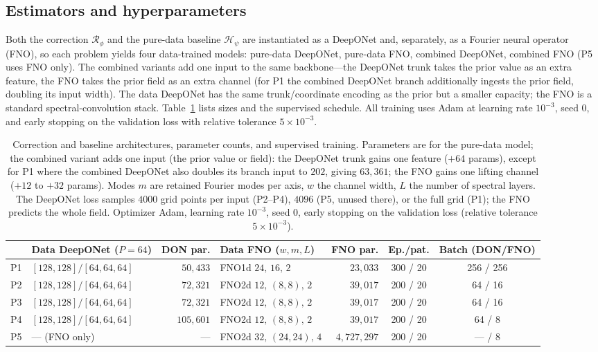 \documentclass[11pt]{article}
\newcommand{\Rcorr}{\mathcal{R}}
\begin{document}
\subsection{Estimators and hyperparameters}
\label{sec:corr-hparams}
Both the correction $\Rcorr_\phi$ and the pure-data baseline $\mathcal{H}_\psi$ are instantiated
as a DeepONet and, separately, as a Fourier neural operator (FNO), so each problem yields four
data-trained models: pure-data DeepONet, pure-data FNO, combined DeepONet, combined FNO
(P5 uses FNO only). The combined variants add one input to the same backbone---the DeepONet
trunk takes the prior value as an extra feature, the FNO takes the prior field as an extra
channel (for P1 the combined DeepONet branch additionally ingests the prior field, doubling its
input width). The data DeepONet has the same trunk/coordinate encoding as the prior but a smaller
capacity; the FNO is a standard spectral-convolution stack. Table~\ref{tab:corr} lists sizes and
the supervised schedule. All training uses Adam at learning rate $10^{-3}$, seed $0$, and early
stopping on the validation loss with relative tolerance $5\times10^{-3}$.

\begin{table}[h]
\centering
\footnotesize
\setlength{\tabcolsep}{5pt}
\begin{tabular}{@{}llrlrcc@{}}
\toprule
& Data DeepONet ($P{=}64$) & DON par. & Data FNO ($w,m,L$) & FNO par. & Ep./pat. & Batch (DON/FNO) \\
\midrule
P1 & $[128,128]/[64,64,64]$ & $50{,}433$ & FNO1d $24,\,16,\,2$ & $23{,}033$ & 300 / 20 & 256 / 256 \\
P2 & $[128,128]/[64,64,64]$ & $72{,}321$ & FNO2d $12,\,(8,8),\,2$ & $39{,}017$ & 200 / 20 & 64 / 16 \\
P3 & $[128,128]/[64,64,64]$ & $72{,}321$ & FNO2d $12,\,(8,8),\,2$ & $39{,}017$ & 200 / 20 & 64 / 16 \\
P4 & $[128,128]/[64,64,64]$ & $105{,}601$ & FNO2d $12,\,(8,8),\,2$ & $39{,}017$ & 200 / 20 & 64 / 8 \\
P5 & --- (FNO only) & --- & FNO2d $32,\,(24,24),\,4$ & $4{,}727{,}297$ & 200 / 20 & --- / 8 \\
\bottomrule
\end{tabular}
\caption{Correction and baseline architectures, parameter counts, and supervised training.
Parameters are for the pure-data model; the combined variant adds one input (the prior value or
field): the DeepONet trunk gains one feature ($+64$ params), except for P1 where the combined
DeepONet also doubles its branch input to $202$, giving $63{,}361$; the FNO gains one lifting
channel ($+12$ to $+32$ params). Modes $m$ are retained Fourier modes per axis, $w$ the channel
width, $L$ the number of spectral layers. The DeepONet loss samples $4000$ grid points per input
(P2--P4), $4096$ (P5, unused there), or the full grid (P1); the FNO predicts the whole field.
Optimizer Adam, learning rate $10^{-3}$, seed $0$, early stopping on the validation loss (relative
tolerance $5\times10^{-3}$).}
\label{tab:corr}
\end{table}
\end{document}
